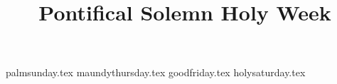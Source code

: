 \documentclass[letterpaper]{report}
\title{Pontifical Solemn Holy Week}
\begin{document}
\layout

\maketitle

{palmsunday.tex}
{maundythursday.tex}
{goodfriday.tex}
{holysaturday.tex}

\printbibliography
\end{document}
